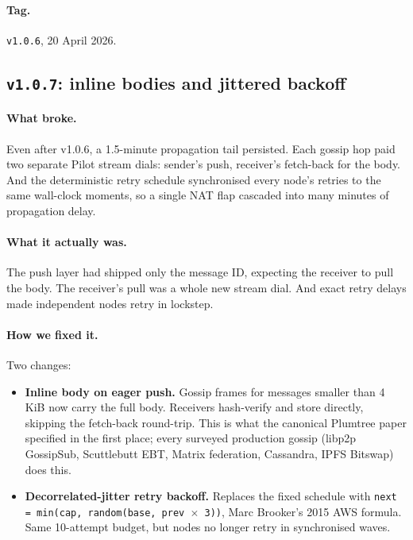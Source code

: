 \documentclass[11pt,a4paper]{article}
\begin{document}
\paragraph*{Tag.} \texttt{v1.0.6}, 20 April 2026.

\subsection{\texttt{v1.0.7}: inline bodies and jittered backoff}

\paragraph{What broke.} Even after v1.0.6, a 1.5-minute
propagation tail persisted. Each gossip hop paid two separate
Pilot stream dials: sender's push, receiver's fetch-back for
the body. And the deterministic retry schedule synchronised
every node's retries to the same wall-clock moments, so a
single NAT flap cascaded into many minutes of propagation
delay.

\paragraph{What it actually was.} The push layer had shipped
only the message ID, expecting the receiver to pull the body.
The receiver's pull was a whole new stream dial. And exact
retry delays made independent nodes retry in lockstep.

\paragraph{How we fixed it.} Two changes:

\begin{itemize}[leftmargin=1.2em]
    \item \textbf{Inline body on eager push.} Gossip frames for
    messages smaller than 4 KiB now carry the full body.
    Receivers hash-verify and store directly, skipping the
    fetch-back round-trip. This is what the canonical Plumtree
    paper specified in the first place; every surveyed
    production gossip (libp2p GossipSub, Scuttlebutt EBT,
    Matrix federation, Cassandra, IPFS Bitswap) does this.
    \item \textbf{Decorrelated-jitter retry backoff.} Replaces
    the fixed schedule with \texttt{next = min(cap,
    random(base, prev $\times$ 3))}, Marc Brooker's 2015 AWS
    formula. Same 10-attempt budget, but nodes no longer retry
    in synchronised waves.
\end{itemize}
\end{document}
